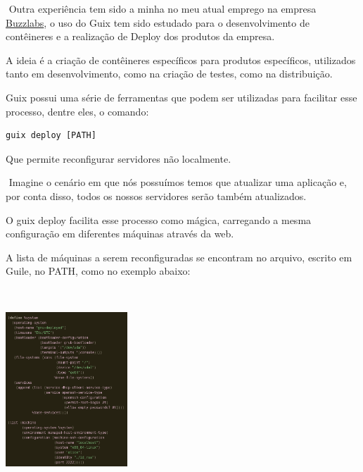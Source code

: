 \documentclass[bigger]{beamer}
\begin{document}
\begin{frame}[label={sec:org6fba835},fragile]{⁤}
 Outra experiência tem sido a minha no meu atual emprego na empresa \href{https://www.buzzlabs.com.br/}{Buzzlabs}, o uso do Guix tem sido estudado
para o desenvolvimento de contêineres e a realização de Deploy dos produtos da empresa.

A ideia é a criação de contêineres específicos para produtos específicos, utilizados tanto em desenvolvimento,
como na criação de testes, como na distribuição.

Guix possui uma série de ferramentas que podem ser utilizadas para facilitar esse processo, dentre eles, o
comando:
\begin{verbatim}
guix deploy [PATH]
\end{verbatim}
Que permite reconfigurar servidores não localmente.
\end{frame}
\begin{frame}[label={sec:orgd536589}]{⁤}
Imagine o cenário em que nós possuímos temos que atualizar uma aplicação e, por conta disso, todos os nossos
servidores serão também atualizados.

O guix deploy facilita esse processo como mágica, carregando a mesma configuração em diferentes máquinas
através da web.

A lista de máquinas a serem reconfiguradas se encontram no arquivo, escrito em Guile, no PATH, como no exemplo
abaixo:
\end{frame}
\begin{frame}[label={sec:org3487465}]{⁤}
\begin{center}
\includegraphics[height=220]{./Deploy.png}
\end{center}
\end{frame}
\end{document}
